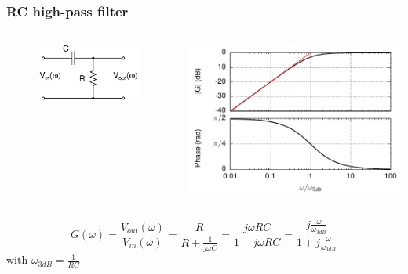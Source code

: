 \documentclass[beamer]{standalone}
\begin{document}
\begin{frame}
\frametitle{RC high-pass filter}
   \begin{columns}[c]
    \begin{column}{.25\textwidth}
     \begin{figure}
      \includegraphics[width=1.00\textwidth]{./circuits/rc_high_pass.pdf}
     \end{figure}
    \end{column}
    \begin{column}{.75\textwidth}
      \includegraphics[angle=0,width=1.00\textwidth]{./plots/rc_high_pass_bode.pdf}
    \end{column}
   \end{columns}
    \[ G(\omega)
    =\frac{V_{out}(\omega)}{V_{in}(\omega)}
    = \frac{R}{R+\frac{1}{j \omega C}} 
    = \frac{j \omega R C}{1+j \omega R C}
    = \frac{j \frac{\omega}{\omega_{3dB}}}{1+j\frac{\omega}{\omega_{3dB}}}
    \]
    with $\omega_{3dB}=\frac{1}{RC}$
\end{frame}
\end{document}
